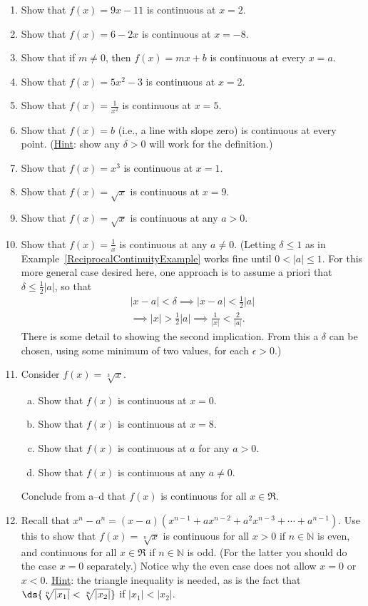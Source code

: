 \setlength{\columnsep}{1cm}
\begin{multicols}{2}
\begin{enumerate}
\item Show that $f(x)=9x-11$ is continuous at $x=2$.
\item Show that $f(x)=6-2x$ is continuous at $x=-8$.
\item Show that if $m\ne 0$, then $f(x)=mx+b$ is continuous at every $x=a$.
\item Show that $f(x)=5x^2-3$ is continuous at $x=2$.
\item Show that $f(x)=\frac1{x^2}$ is continuous at $x=5$.
\item Show that $f(x)=b $ (i.e., a line with slope zero)\label{HWConstAreCont}
is continuous at every point. (\underline{Hint}:
show any $\delta>0$ will work for the definition.)
\item Show that $f(x)=x^3$ is continuous at $x=1$.
\item Show that $f(x)=\sqrt{x}$ is continuous at $x=9$.
\item Show that $f(x)=\sqrt{x}$ is continuous at
any $a>0$.
\item Show that $f(x)=\frac1x$ is continuous at any
$a\ne 0$. (Letting $\delta\le1$ as in Example~\ref{ReciprocalContinuityExample}
works fine until $0<|a|\le1$.  For this more general case
desired here, one approach is to assume 
a priori that $\delta\le\frac12|a|$,
so that 
\begin{multline*}
|x-a|<\delta\implies |x-a|<\frac12|a|\\ \implies |x|>\frac12|a|
\implies\frac1{|x|}<\frac2{|a|}.\end{multline*}
There is some detail to showing the second implication.
From this a $\delta$ can be chosen, using some minimum of
two values, for each $\epsilon>0$.)
\label{ReciprocalContinuityHomework}
\item Consider $f(x)=\sqrt[3]{x}$.
\begin{enumerate}[(a)]
\item Show that $f(x)$ is continuous at $x=0$.
\item Show that $f(x)$ is continuous at $x=8$.
\item Show that $f(x)$ is continuous at $a$ for any $a>0$.
\item Show that $f(x)$ is continuous at any $a\ne0$.
\end{enumerate}
Conclude from a--d that $f(x)$ is continuous for all $x\in\Re$.
\item\label{ContinuityOfRadicalsHomework} 
Recall that $x^n-a^n=(x-a)(x^{n-1}+ax^{n-2}+a^2x^{n-3}
+\cdots+a^{n-1})$.  Use this to show that
$f(x)=\sqrt[n]{x}$ is continuous for all $x>0$ if $n\in\mathbb{N}$ is even,
and continuous for all $x\in\Re$ if $n\in\mathbb{N}$ is odd.
(For the latter you should do the case $x=0$ separately.)
Notice why the even case does not allow $x=0$ or $x<0$.
\underline{Hint}: the triangle inequality is needed, as 
is the fact that $\ds{\sqrt[n]{\left|x_1\right|}
<\sqrt[n]{\left|x_2\right|}}$ if $|x_1|<|x_2|$. 
\end{enumerate}

\end{multicols}
